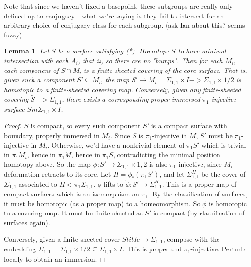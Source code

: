 \documentclass[12pt]{amsart}
\newtheorem{lemma}[theorem]{Lemma}
\theoremstyle{definition}
\newcommand{\x}{\times}
\newcommand{\Si}{\Sigma}
\newcommand{\cin}{\subseteq}
\begin{document}
Note that since we
haven't fixed a basepoint, these subgroups are really only defined up to
conjugacy - what we're saying is they fail to intersect for an arbitrary choice
of conjugacy class for each subgroup. (ask Ian about this? seems fuzzy)

\begin{lemma}

Let $S$ be a surface satisfying (*). Homotope
$S$ to have minimal intersection with each $A_i$, that is, so there are no "bumps".
Then for each $M_i$, each component of $S \cap M_i$ is a finite-sheeted covering
of the core surface. That is, given such a component $S' \cin M_i$, the map $S'
\to M_i = \Si_{1,1}\x I -> \Si_{1,1}\x{1/2}$ is homotopic to a finite-sheeted covering
map. Conversely, given any finite-sheeted covering $\widetilde{S} -> \Si_{1,1}$, there
exists a corresponding proper immersed $\pi_1$-injective surface $S in \Si_{1,1}\x I$.

\end{lemma}
\begin{proof}

$S$ is compact, so every such component $S'$ is a compact surface with
boundary, properly immersed in $M_i$. Since $S$ is $\pi_1$-injective in $M$, $S'$ must be
$\pi_1$-injective in $M_i$. Otherwise, we'd have a nontrivial element of $\pi_1S'$ which
is trivial in $\pi_1M_i$, hence in $\pi_1M$, hence in $\pi_1S$, contradicting the minimal
position homotopy above. So the map $\phi : S'\to\Si_{1,1}\x{1,2}$ is also $\pi_1$-injective,
since $M_i$ deformation retracts to its core. Let $H = \phi_*(\pi_1S')$, and let
$\Si_{1,1}^H$
be the cover of $\Si_{1,1}$ associated to $H<\pi_1\Si_{1,1}$. $\phi$ lifts to
$\widetilde{\phi}\colon S'\to
\Si_{1,1}^H$. This is a proper map of compact surfaces which is an isomorphism
on $\pi_1$.
By the classification of surfaces, it must be homotopic (as a proper map) to
a homeomorphism. So $\phi$ is homotopic to a covering map. It must be
finite-sheeted as $S'$ is compact (by classification of surfaces again).

Conversely, given a finite-sheeted cover $Stilde \to \Si_{1,1}$, compose with the
embedding $\Si_{1,1} = \Si_{1,1}\x{1/2} \cin \Si_{1,1}\x I$. This is proper and $\pi_1$-injective.
Perturb locally to obtain an immersion.

\end{proof}
\end{document}
